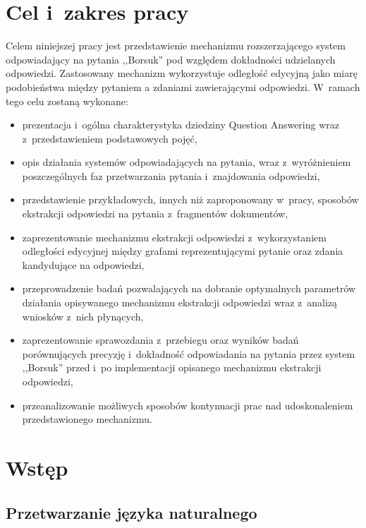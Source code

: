 \documentclass[a4paper, twoside, 12pt]{report}
\begin{document}
\chapter{Cel i~zakres pracy}
    Celem niniejszej pracy jest przedstawienie mechanizmu rozszerzającego system odpowiadający na pytania ,,Borsuk''
    pod względem dokładności udzielanych odpowiedzi. Zastosowany mechanizm wykorzystuje odległość edycyjną jako miarę
    podobieństwa między pytaniem a zdaniami zawierającymi odpowiedzi. W~ramach tego celu zostaną wykonane:
    \begin{itemize}
        \item prezentacja i~ogólna charakterystyka dziedziny Question Answering wraz z~przedstawieniem podstawowych
            pojęć,
        \item opis działania systemów odpowiadających na pytania, wraz z~wyróżnieniem poszczególnych faz przetwarzania
            pytania i~znajdowania odpowiedzi,
        \item przedstawienie przykładowych, innych niż zaproponowany w~pracy,
            sposobów ekstrakcji odpowiedzi na pytania z~fragmentów dokumentów,
        \item zaprezentowanie mechanizmu ekstrakcji odpowiedzi z~wykorzystaniem odległości edycyjnej między grafami
            reprezentującymi pytanie oraz zdania kandydujące na odpowiedzi,
        \item przeprowadzenie badań pozwalających na dobranie optymalnych parametrów działania opisywanego
            mechanizmu ekstrakcji odpowiedzi wraz z~analizą wniosków z~nich płynących,
       \item zaprezentowanie sprawozdania z~przebiegu oraz wyników badań porównujących precyzję i~dokładność
           odpowiadania na pytania przez system ,,Borsuk'' przed i~po implementacji opisanego mechanizmu ekstrakcji
           odpowiedzi,
       \item przeanalizowanie możliwych sposobów kontynuacji prac nad udoskonaleniem przedstawionego mechanizmu.

    \end{itemize}

\chapter{Wstęp}
    \section{Przetwarzanie języka naturalnego}
\end{document}
